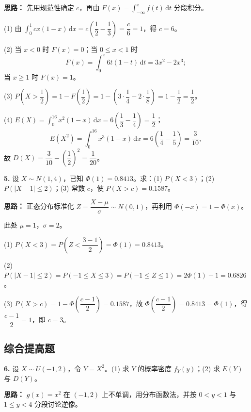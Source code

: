 \ifshowsolutions%
\textbf{思路：} 先用规范性确定 $c$，再由 $F(x)=\int_{-\infty}^{x}f(t)\,\mathrm{d}t$ 分段积分。

(1) 由 $\int_0^1cx(1-x)\,\mathrm{d}x=c\left(\dfrac12-\dfrac13\right)=\dfrac{c}{6}=1$，得 $c=6$。

(2) 当 $x<0$ 时 $F(x)=0$；当 $0\leq x<1$ 时
\[
F(x)=\int_0^x6t(1-t)\,\mathrm{d}t=3x^2-2x^3;
\]
当 $x\geq1$ 时 $F(x)=1$。

(3) $P\!\left(X>\dfrac12\right)=1-F\!\left(\dfrac12\right)=1-\left(3\cdot\dfrac14-2\cdot\dfrac18\right)=1-\dfrac12=\dfrac12$。

(4) $E(X)=\int_0^16x^2(1-x)\,\mathrm{d}x=6\left(\dfrac13-\dfrac14\right)=\dfrac12$；
\[
E(X^2)=\int_0^16x^3(1-x)\,\mathrm{d}x=6\left(\dfrac14-\dfrac15\right)=\dfrac{3}{10},
\]
故 $D(X)=\dfrac{3}{10}-\left(\dfrac12\right)^2=\dfrac{1}{20}$。

\else \answerarea[8] \fi%

\textbf{5.} 设 $X\sim N(1,4)$，已知 $\Phi(1)=0.8413$。求：(1) $P(X<3)$；(2) $P(|X-1|\leq2)$；(3) 常数 $c$，使 $P(X>c)=0.1587$。

\ifshowsolutions%
\textbf{思路：} 正态分布标准化 $Z=\dfrac{X-\mu}{\sigma}\sim N(0,1)$，再利用 $\Phi(-x)=1-\Phi(x)$。

此处 $\mu=1$，$\sigma=2$。

(1) $P(X<3)=P\!\left(Z<\dfrac{3-1}{2}\right)=\Phi(1)=0.8413$。

(2) $P(|X-1|\leq2)=P(-1\leq X\leq3)=P(-1\leq Z\leq1)=2\Phi(1)-1=0.6826$。

(3) $P(X>c)=1-\Phi\!\left(\dfrac{c-1}{2}\right)=0.1587$，故 $\Phi\!\left(\dfrac{c-1}{2}\right)=0.8413=\Phi(1)$，得 $\dfrac{c-1}{2}=1$，即 $c=3$。

\else \answerarea[8] \fi%

\subsection{综合提高题}

\textbf{6.} 设 $X\sim U(-1,2)$，令 $Y=X^2$。(1) 求 $Y$ 的概率密度 $f_Y(y)$；(2) 求 $E(Y)$ 与 $D(Y)$。

\ifshowsolutions%
\textbf{思路：} $g(x)=x^2$ 在 $(-1,2)$ 上不单调，用分布函数法，并按 $0<y<1$ 与 $1\leq y<4$ 分段讨论逆像。

